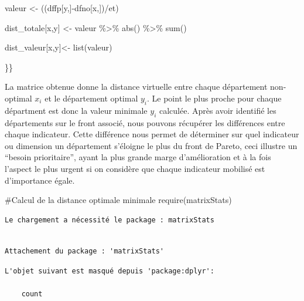 \documentclass[
  french,
  11pt,
  a4paper,
]{article}
\newenvironment{Shaded}{}{}
\newcommand{\CommentTok}[1]{\textcolor[rgb]{0.42,0.45,0.49}{#1}}
\newcommand{\FunctionTok}[1]{\textcolor[rgb]{0.44,0.26,0.76}{#1}}
\newcommand{\NormalTok}[1]{\textcolor[rgb]{0.14,0.16,0.18}{#1}}
\newcommand{\OtherTok}[1]{\textcolor[rgb]{0.44,0.26,0.76}{#1}}
\newcommand{\SpecialCharTok}[1]{\textcolor[rgb]{0.00,0.36,0.77}{#1}}
\begin{document}
\begin{Shaded}
\begin{Highlighting}[]
\NormalTok{    valeur }\OtherTok{\textless{}{-}}\NormalTok{ ((dffp[y,]}\SpecialCharTok{{-}}\NormalTok{dfno[x,])}\SpecialCharTok{/}\NormalTok{et)}
    
\NormalTok{    dist\_totale[x,y] }\OtherTok{\textless{}{-}}\NormalTok{ valeur }\SpecialCharTok{\%\textgreater{}\%} 
      \FunctionTok{abs}\NormalTok{() }\SpecialCharTok{\%\textgreater{}\%} 
      \FunctionTok{sum}\NormalTok{()}
    
\NormalTok{    dist\_valeur[x,y]}\OtherTok{\textless{}{-}} \FunctionTok{list}\NormalTok{(valeur)}
    
\NormalTok{  \}\}}
\end{Highlighting}
\end{Shaded}

La matrice obtenue donne la distance virtuelle entre chaque département
non-optimal \(x_i\) et le département optimal \(y_i\). Le point le plus
proche pour chaque départment est donc la valeur minimale \(y_i\)
calculée. Après avoir identifié les départements sur le front associé,
nous pouvons récupérer les différences entre chaque indicateur. Cette
différence nous permet de déterminer sur quel indicateur ou dimension un
département s'éloigne le plus du front de Pareto, ceci illustre un
``besoin prioritaire'', ayant la plus grande marge d'amélioration et à
la fois l'aspect le plus urgent si on considère que chaque indicateur
mobilisé est d'importance égale.

\begin{Shaded}
\begin{Highlighting}[]
\CommentTok{\#Calcul de la distance optimale minimale}
\FunctionTok{require}\NormalTok{(matrixStats)}
\end{Highlighting}
\end{Shaded}

\begin{verbatim}
Le chargement a nécessité le package : matrixStats
\end{verbatim}

\begin{verbatim}

Attachement du package : 'matrixStats'
\end{verbatim}

\begin{verbatim}
L'objet suivant est masqué depuis 'package:dplyr':

    count
\end{verbatim}
\end{document}
